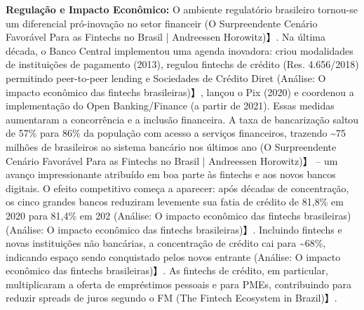 \documentclass[12pt]{article}
\begin{document}
\textbf{Regulação e Impacto Econômico:} O ambiente regulatório brasileiro tornou-se um diferencial pró-inovação no setor financeir (O Surpreendente Cenário Favorável Para as Fintechs no Brasil | Andreessen Horowitz)】. Na última década, o Banco Central implementou uma agenda inovadora: criou modalidades de instituições de pagamento (2013), regulou fintechs de crédito (Res. 4.656/2018) permitindo peer-to-peer lending e Sociedades de Crédito Diret (Análise: O impacto econômico das fintechs brasileiras)】, lançou o Pix (2020) e coordenou a implementação do Open Banking/Finance (a partir de 2021). Essas medidas aumentaram a concorrência e a inclusão financeira. A taxa de bancarização saltou de 57\% para 86\% da população com acesso a serviços financeiros, trazendo \textasciitilde75 milhões de brasileiros ao sistema bancário nos últimos ano (O Surpreendente Cenário Favorável Para as Fintechs no Brasil | Andreessen Horowitz)】 – um avanço impressionante atribuído em boa parte às fintechs e aos novos bancos digitais. O efeito competitivo começa a aparecer: após décadas de concentração, os cinco grandes bancos reduziram levemente sua fatia de crédito de 81,8\% em 2020 para 81,4\% em 202 (Análise: O impacto econômico das fintechs brasileiras) (Análise: O impacto econômico das fintechs brasileiras)】. Incluindo fintechs e novas instituições não bancárias, a concentração de crédito cai para \textasciitilde68\%, indicando espaço sendo conquistado pelos novos entrante (Análise: O impacto econômico das fintechs brasileiras)】. As fintechs de crédito, em particular, multiplicaram a oferta de empréstimos pessoais e para PMEs, contribuindo para reduzir spreads de juros segundo o FM (The Fintech Ecosystem in Brazil)】.
\end{document}
